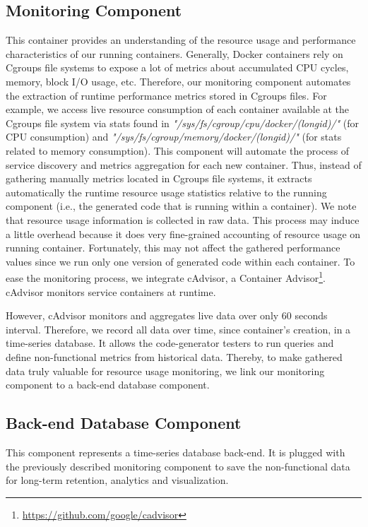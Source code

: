 \subsection{Monitoring Component}
This container provides an understanding of the resource usage and performance characteristics of our running containers. Generally, Docker containers rely on Cgroups file systems to expose a lot of metrics about accumulated CPU cycles, memory, block I/O usage, etc. Therefore, our monitoring component automates the extraction of runtime performance metrics stored in Cgroups files. For example, we access live resource consumption of each container available at the Cgroups file system via stats found in \textit{"/sys/fs/cgroup/cpu/docker/(longid)/"} (for CPU consumption) and \textit{"/sys/fs/cgroup/memory/docker/(longid)/"} (for stats related to memory consumption). This component will automate the process of service discovery and metrics aggregation for each new container. Thus, instead of gathering manually metrics located in Cgroups file systems, it extracts automatically the runtime resource usage statistics relative to the running component (i.e., the generated code that is running within a container). We note that resource usage information is collected in raw data. This process may induce a little overhead because it does  very fine-grained accounting of resource usage on running container. Fortunately, this may not affect the gathered performance values since we run only one version of generated code within each container.
To ease the monitoring process, we integrate cAdvisor, a Container Advisor\footnote{\url{https://github.com/google/cadvisor}}. cAdvisor monitors service containers at runtime. 

However, cAdvisor monitors and aggregates live data over only 60 seconds interval. Therefore, we record all data over time, since container's creation, in a time-series database. It allows the code-generator testers to run queries and define non-functional metrics from historical data. Thereby, to make gathered data truly valuable for resource usage monitoring, we link our monitoring component to a back-end database component. 



\subsection{Back-end Database Component}
This component represents a time-series database back-end. It is plugged with the previously described monitoring component to save the non-functional data for long-term retention, analytics and visualization. 

